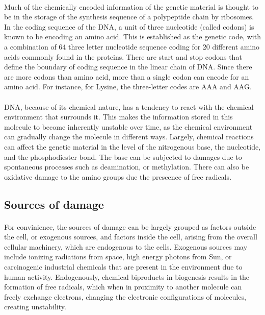 \paragraph*{} Much of the chemically encoded information of the genetic material is thought to be in the storage of the synthesis sequence of a polypeptide chain by ribosomes. In the coding sequence of the DNA, a unit of three nucleotide (called codons) is known to be encoding an amino acid. This is established as the genetic code, with a combination of 64 three letter nucleotide sequence coding for 20 different amino acids commonly found in the proteins. There are start and stop codons that define the boundary of coding sequence in the linear chain of DNA. Since there are more codons than amino acid, more than a single codon can encode for an amino acid. For instance, for Lysine, the three-letter codes are AAA and AAG.

\paragraph*{} DNA, because of its chemical nature, has a tendency to react with the chemical environment that surrounds it. This makes the information stored in this molecule to become inherently unstable over time, as the chemical environment can gradually change the molecule in different ways. Largely, chemical reactions can affect the genetic material in the level of the nitrogenous base, the nucleotide, and the phosphodiester bond. The base can be subjected to damages due to spontaneous processes such as deamination, or methylation. There can also be oxidative damage to the amino groups due the prescence of free radicals.


\subsection{Sources of damage}
\paragraph*{} For convinience, the sources of damage can be largely grouped as factors outside the cell, or exogenous sources, and factors inside the cell, arising from the overall cellular machinery, which are endogenous to the cells. Exogenous sources may include ionizing radiations from space, high energy photons from Sun, or carcinogenic industrial chemicals that are present in the environment due to human activity. Endogenously, chemical biproducts in biogenesis results in the formation of free radicals, which when in proximity to another molecule can freely exchange electrons, changing the electronic configurations of molecules, creating unstability.

